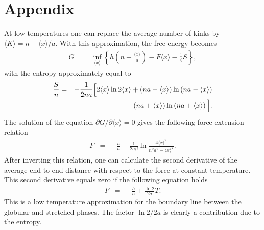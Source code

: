 \documentclass[doublecol,figures]{epl2}
\begin{document}
\section{Appendix}\label{app}
At low temperatures one can replace the average number of kinks by $\langle
K\rangle=n-\langle x\rangle/a$. With this approximation, the free energy
becomes
\begin{eqnarray}
G&=&\inf_{\langle x\rangle}\left\{h\left(n-\frac{\langle
x\rangle}{a}\right)-F\langle
x\rangle-\frac{1}{\beta}S\right\},
\end{eqnarray}
with the entropy approximately equal to
\begin{eqnarray}
\frac Sn&=&-\frac1{2na}\Big[2\langle x\rangle\ln2\langle
x\rangle+\left(na-\langle x\rangle\right)\ln\left(na-\langle
x\rangle\right)
\cr
&&-\left(na+\langle x\rangle\right)\ln\left(na+\langle
x\rangle\right)\Big].
\end{eqnarray}
The solution of the equation $\partial G/\partial\langle x\rangle=0$ gives the
following force-extension relation
\begin{eqnarray}
F&=&-\frac ha+\frac1{2a\beta}\ln\frac{4\langle x\rangle^2}{n^2a^2-\langle
x\rangle^2}.
\end{eqnarray}
After inverting this relation, one can calculate the second derivative of the
average end-to-end distance with respect to the force at constant temperature.
This second derivative equals zero if the following equation holds
\begin{eqnarray}\label{appr_Fb}
F&=&-\frac ha+\frac{\ln2}{2a}T.
\end{eqnarray}
This is a low temperature approximation for the boundary line between the
globular
and stretched phases. The factor $\ln2/2a$ is clearly a contribution due to the
entropy. 
\end{document}
